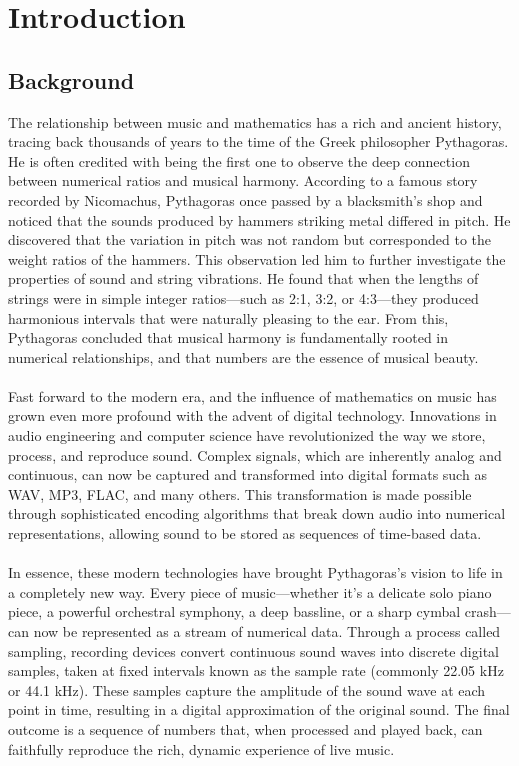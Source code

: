 \chapter{Introduction}
\section{Background}
The relationship between music and mathematics has a rich and ancient history, tracing back thousands of years to the time of the Greek philosopher Pythagoras. He is often credited with being the first one to observe the deep connection between numerical ratios and musical harmony. According to a famous story recorded by Nicomachus, Pythagoras once passed by a blacksmith’s shop and noticed that the sounds produced by hammers striking metal differed in pitch. He discovered that the variation in pitch was not random but corresponded to the weight ratios of the hammers. This observation led him to further investigate the properties of sound and string vibrations. He found that when the lengths of strings were in simple integer ratios—such as 2:1, 3:2, or 4:3—they produced harmonious intervals that were naturally pleasing to the ear. From this, Pythagoras concluded that musical harmony is fundamentally rooted in numerical relationships, and that numbers are the essence of musical beauty.\\
\\
Fast forward to the modern era, and the influence of mathematics on music has grown even more profound with the advent of digital technology. Innovations in audio engineering and computer science have revolutionized the way we store, process, and reproduce sound. Complex signals, which are inherently analog and continuous, can now be captured and transformed into digital formats such as WAV, MP3, FLAC, and many others. This transformation is made possible through sophisticated encoding algorithms that break down audio into numerical representations, allowing sound to be stored as sequences of time-based data.\\
\\
In essence, these modern technologies have brought Pythagoras's vision to life in a completely new way. Every piece of music—whether it's a delicate solo piano piece, a powerful orchestral symphony, a deep bassline, or a sharp cymbal crash—can now be represented as a stream of numerical data. Through a process called sampling, recording devices convert continuous sound waves into discrete digital samples, taken at fixed intervals known as the sample rate (commonly 22.05 kHz or 44.1 kHz). These samples capture the amplitude of the sound wave at each point in time, resulting in a digital approximation of the original sound. The final outcome is a sequence of numbers that, when processed and played back, can faithfully reproduce the rich, dynamic experience of live music.\\
